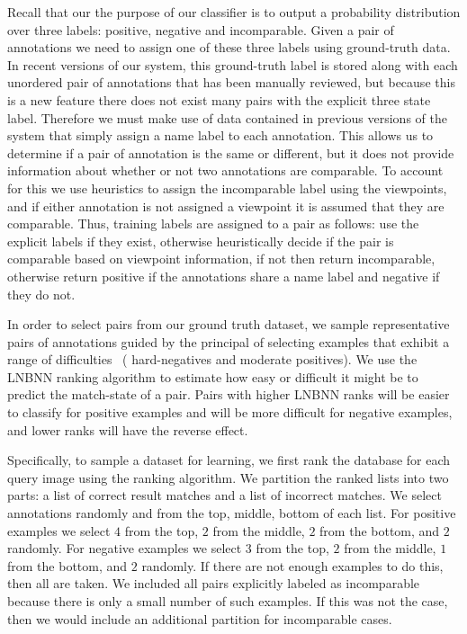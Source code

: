 Recall that our the purpose of our classifier is to output a probability distribution over three labels:
positive, negative and incomparable.
Given a pair of annotations we need to assign one of these three labels using ground-truth data.
In recent versions of our system, this ground-truth label is stored along with each unordered pair of annotations
  that has been manually reviewed, but because this is a new feature there does not exist many pairs with the
  explicit three state label.
Therefore we must make use of data contained in previous versions of the system that simply assign a name label
  to each annotation.
This allows us to determine if a pair of annotation is the same or different, but it does not provide information
  about whether or not two annotations are comparable.
To account for this we use heuristics to assign the incomparable label using the viewpoints, and if either
  annotation is not assigned a viewpoint it is assumed that they are comparable.
Thus, training labels are assigned to a pair as follows:
use the explicit labels if they exist, otherwise heuristically decide if the pair is comparable based on
  viewpoint information, if not then return incomparable, otherwise return positive if the annotations share a name
  label and negative if they do not.


In order to select pairs from our ground truth dataset, we sample representative pairs of annotations guided by
  the principal of selecting examples that exhibit a range of difficulties~\cite{shi_embedding_2016} (\eg
  hard-negatives and moderate positives).
We use the LNBNN ranking algorithm to estimate how easy or difficult it might be to predict the match-state of a
  pair.
Pairs with higher LNBNN ranks will be easier to classify for positive examples and will be more difficult for
  negative examples, and lower ranks will have the reverse effect.

Specifically, to sample a dataset for learning, we first rank the database for each query image using the ranking
  algorithm.
We partition the ranked lists into two parts:
a list of correct result matches and a list of incorrect matches.
We select annotations randomly and from the top, middle, bottom of each list.
For positive examples we select $4$ from the top, $2$ from the middle, $2$ from the bottom, and $2$ randomly.
For negative examples we select $3$ from the top, $2$ from the middle, $1$ from the bottom, and $2$ randomly.
If there are not enough examples to do this, then all are taken.
We included all pairs explicitly labeled as incomparable because there is only a small number of such examples.
If this was not the case, then we would include an additional partition for incomparable cases.


